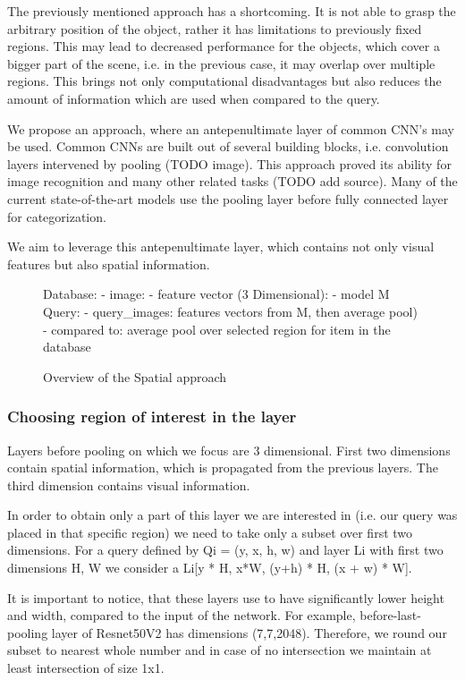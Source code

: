 The previously mentioned approach has a shortcoming. It is not able to grasp the arbitrary position of the object, rather it has limitations to previously fixed regions. This may lead to decreased performance for the objects, which cover a bigger part of the scene, i.e. in the previous case, it may overlap over multiple regions. This brings not only computational disadvantages but also reduces the amount of information which are used when compared to the query.

We propose an approach, where an antepenultimate layer of common CNN's may be used. Common CNNs are built out of several building blocks, i.e. convolution layers intervened by pooling (TODO image). This approach proved its ability for image recognition and many other related tasks (TODO add source). Many of the current state-of-the-art models use the pooling layer before fully connected layer for categorization.

We aim to leverage this antepenultimate layer, which contains not only visual features but also spatial information.

\begin{figure}
\centering
\begin{boxedverbatim}
Database:
    - image:
        - feature vector (3 Dimensional):
    - model M
Query:
    - query_images: features vectors from M, then average pool)
    - compared to: average pool over selected region for item 
                   in the database
\end{boxedverbatim}
\caption{Overview of the Spatial approach}
\end{figure}


\subsubsection{Choosing region of interest in the layer}

Layers before pooling on which we focus are 3 dimensional. First two dimensions contain spatial information, which is propagated from the previous layers. The third dimension contains visual information.

In order to obtain only a part of this layer we are interested in (i.e. our query was placed in that specific region) we need to take only a subset over first two dimensions. For a query defined by Qi = (y, x, h, w) and layer Li with first two dimensions H, W we consider a Li[y * H, x*W, (y+h) * H, (x + w) * W]. 

It is important to notice, that these layers use to have significantly lower height and width, compared to the input of the network. For example, before-last-pooling layer of Resnet50V2 has dimensions (7,7,2048). Therefore, we round our subset to nearest whole number and in case of no intersection we maintain at least intersection of size 1x1.

